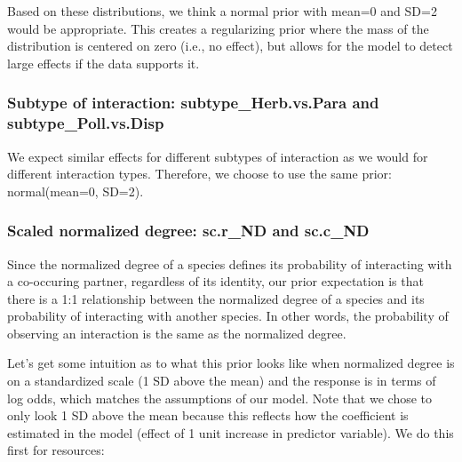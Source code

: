 \documentclass[11pt,]{article}
\begin{document}
Based on these distributions, we think a normal prior with mean=0 and
SD=2 would be appropriate. This creates a regularizing prior where the
mass of the distribution is centered on zero (i.e., no effect), but
allows for the model to detect large effects if the data supports it.

\subsubsection{\texorpdfstring{Subtype of interaction:
\textbf{subtype\_Herb.vs.Para} and
\textbf{subtype\_Poll.vs.Disp}}{Subtype of interaction: subtype\_Herb.vs.Para and subtype\_Poll.vs.Disp}}\label{subtype-of-interaction-subtype_herb.vs.para-and-subtype_poll.vs.disp}

We expect similar effects for different subtypes of interaction as we
would for different interaction types. Therefore, we choose to use the
same prior: normal(mean=0, SD=2).

\subsubsection{\texorpdfstring{Scaled normalized degree:
\textbf{sc.r\_ND} and
\textbf{sc.c\_ND}}{Scaled normalized degree: sc.r\_ND and sc.c\_ND}}\label{scaled-normalized-degree-sc.r_nd-and-sc.c_nd}

Since the normalized degree of a species defines its probability of
interacting with a co-occuring partner, regardless of its identity, our
prior expectation is that there is a 1:1 relationship between the
normalized degree of a species and its probability of interacting with
another species. In other words, the probability of observing an
interaction is the same as the normalized degree.

Let's get some intuition as to what this prior looks like when
normalized degree is on a standardized scale (1 SD above the mean) and
the response is in terms of log odds, which matches the assumptions of
our model. Note that we chose to only look 1 SD above the mean because
this reflects how the coefficient is estimated in the model (effect of 1
unit increase in predictor variable). We do this first for resources:
\end{document}
